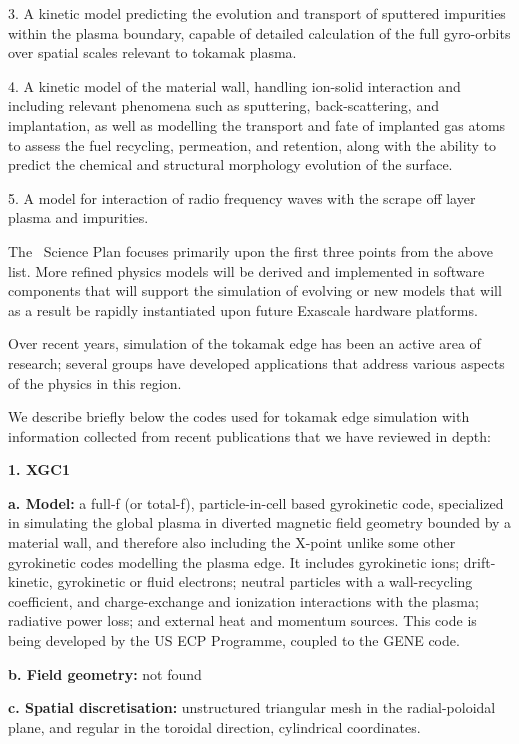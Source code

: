 \documentclass{article}
\begin{document}
{ 3. A kinetic model predicting the evolution and transport of sputtered 
impurities within the plasma boundary, capable of detailed calculation of the full 
gyro-orbits over spatial scales relevant to tokamak plasma.}

{ 4. A kinetic model of the material wall, handling ion-solid interaction 
and including relevant phenomena such as sputtering, back-scattering, and implantation, 
as well as modelling the transport and fate of implanted gas atoms to assess the 
fuel recycling, permeation, and retention, along with the ability to predict the 
chemical and structural morphology evolution of the surface.}

{ 5. A model for interaction of radio frequency waves with the scrape 
off layer plasma and impurities.}

The \nep \   Science Plan focuses primarily upon the first three points from the 
above list. More refined physics models will be derived and implemented in software 
components that will support the simulation of evolving or new models that will 
as a result be rapidly instantiated upon future Exascale hardware platforms.

Over recent years, simulation of the tokamak edge has been an active area of research; 
several groups have developed applications that address various aspects of the 
physics in this region.  

We describe briefly below the codes used for tokamak edge simulation with information 
collected from recent publications that we have reviewed in depth:

{ \textbf{1. XGC1 }}{~\cite{ref [7]}}

\textbf{a. Model:} a full-f (or total-f), particle-in-cell based gyrokinetic code, 
specialized in simulating the global plasma in diverted magnetic field geometry 
bounded by a material wall, and therefore also including the X-point unlike some 
other  gyrokinetic codes modelling the plasma edge. It includes gyrokinetic ions; 
drift-kinetic, gyrokinetic or fluid electrons; neutral particles with a wall-recycling 
coefficient, and charge-exchange and ionization interactions with the plasma; radiative 
power loss; and external heat and momentum sources. This code is being developed 
by the US ECP Programme, coupled to the GENE code.

\textbf{b. Field geometry:}{  not found}

\textbf{c. Spatial discretisation:}{  unstructured triangular mesh 
in the radial-poloidal plane, and regular in the toroidal direction, cylindrical 
coordinates.}
\end{document}
